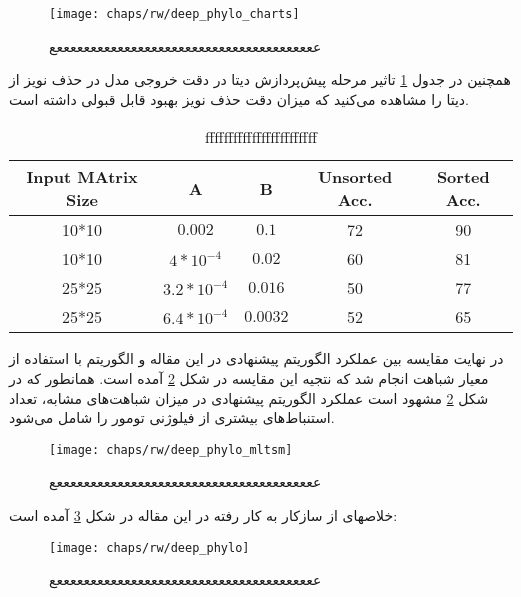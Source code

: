 \begin{figure}[!ht]
	\centerline{\texttt{[image: chaps/rw/deep\_phylo\_charts]}}
	\caption{عععععععععععععععععععععععععععععععععععععععع}
	\label{fig:ch_rw:deep_phylo_charts}
\end{figure}

همچنین در جدول \ref{tab:table_55} تاثیر مرحله پیش‌پردازش دیتا در دقت خروجی مدل در حذف نویز از دیتا را مشاهده می‌کنید که میزان دقت حذف نویز بهبود قابل قبولی داشته است. 

\begin{latin}
\begin{table}[!ht]
	\centering
	\begin{tabular}{|c|c|c|c|c|}
		\hline
		\rowcolor[gray]{0.9}
		Input MAtrix Size & A            & B        & Unsorted Acc. & Sorted Acc.  	 \\\hline
		10*10               & $0.002$       & $0.1$    & 72            & 90          \\\hline
		10*10               & $4*10^{-4}$   & $0.02$   & 60            & 81          \\\hline
		25*25               & $3.2*10^{-4}$ & $0.016$  & 50            & 77          \\\hline
		25*25               & $6.4*10^{-4}$ & $0.0032$ & 52            & 65         \\\hline
	\end{tabular}\par
\caption{ffffffffffffffffffffffff}
\label{tab:table_55}
\end{table}
\end{latin}



در نهایت مقایسه بین عملکرد الگوریتم پیشنهادی در این مقاله و الگوریتم  با استفاده از معیار شباهت  انجام شد که نتجیه این مقایسه در شکل \ref{fig:ch_rw:deep_phylo_mltsm} آمده است. همانطور که در شکل \ref{fig:ch_rw:deep_phylo_mltsm} مشهود است عملکرد الگوریتم پیشنهادی در میزان شباهت‌های مشابه، تعداد استنباط‌های بیشتری از فیلوژنی تومور را شامل می‌شود. 


\begin{figure}[!ht]
	\centerline{\texttt{[image: chaps/rw/deep\_phylo\_mltsm]}}
	\caption{عععععععععععععععععععععععععععععععععععععععع}
	\label{fig:ch_rw:deep_phylo_mltsm}
\end{figure}


خلاصهای از سازکار به کار رفته در این مقاله در شکل \ref{fig:ch_rw:deep_phylo} آمده است: 

\begin{figure}[!ht]
	\centerline{\texttt{[image: chaps/rw/deep\_phylo]}}
	\caption{عععععععععععععععععععععععععععععععععععععععع}
	\label{fig:ch_rw:deep_phylo}
\end{figure}





